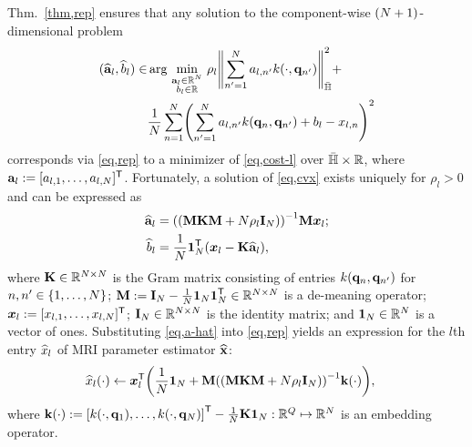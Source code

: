 Thm.~\ref{thm,rep} ensures 
that any solution
to the component-wise 
$\paren{N+1}$-dimensional problem
\begin{align}
	(\est{\bma}_l,\est{b}_l) \in 
	&\argmin{\substack{\bma_l \in \reals{N} \\ b_l \in \real}} 
	\rho_l \norm{\sum_{n'=1}^N a_{l,n'} k(\cdot,\bmq_{n'})}^2_\rkhs + \nonumber \\
	&\frac{1}{N} \sum_{n=1}^N \paren{\sum_{n'=1}^N a_{l,n'} k(\bmq_n,\bmq_{n'}) + b_l - x_{l,n}}^2
	\label{eq,cvx}
\end{align}
corresponds via \eqref{eq,rep} 
to a minimizer of \eqref{eq,cost-l}
over ${\bar{\mathbb{H}}} \times \mathbb{R}$,
where $\mathbf{a}_l := [a_{l,1},\dots,a_{l,N}]^{\mathsf{T}}$.
Fortunately, a solution of \eqref{eq,cvx} exists uniquely
for $\rho_l > 0$
and can be expressed as
\begin{align}
	\est{\bma}_l &= \inv{\paren{\bmM \bmK \bmM + N\rho_l\eye{N}}} \bmM \bmxtl{l};
	\label{eq,a-hat} \\
	\est{b}_l &= \frac{1}{N} \ones{N}\tpose \paren{\bmxtl{l} - \bmK \est{\bma}_l},
	\label{eq,b-hat}
\end{align}
where 
$\mathbf{K} \in \mathbb{R}^{N \times N}$ is the Gram matrix 
consisting of entries $k(\mathbf{q}_n,\mathbf{q}_{n'})$ for $n,n' \in \set{1,\dots,N}$;
$\mathbf{M} := \mathbf{I}_{N}-\frac{1}{N}\boldsymbol{1}_{N}\boldsymbol{1}_{N}^{\mathsf{T}} \in \mathbb{R}^{N \times N}$
is a de-meaning operator;
$\boldsymbol{x}_{l} := [x_{l,1},\dots,x_{l,N}]^{\mathsf{T}}$;
$\mathbf{I}_{N} \in \mathbb{R}^{N \times N}$ is the identity matrix;
and $\boldsymbol{1}_{N} \in \mathbb{R}^{N}$ is a vector of ones.
Substituting \eqref{eq,a-hat} into \eqref{eq,rep} 
yields an expression 
for the $l$th entry $\widehat{x}_l$ 
of MRI parameter estimator $\widehat{\mathbf{x}}$:
\begin{align}
	\est{x}_l\paren{\cdot} &\gets \bmxtl{l}\tpose 
		\paren{\frac{1}{N}\ones{N} + 
		\bmM\inv{\paren{\bmM\bmK\bmM + N\rho_l\eye{N}}} \bmka{\cdot}},
		\label{eq,xl-hat}
\end{align}
where
$\bmka{\cdot} := 
	\brac{k(\cdot,\bmq_1),\dots,k(\cdot,\bmq_N)}\tpose - \frac{1}{N}\bmK\ones{N}
	: \reals{Q} \mapsto \reals{N}$
is an embedding operator.


